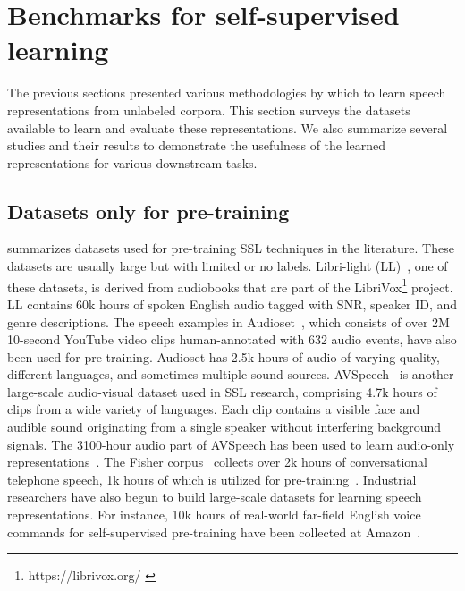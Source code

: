 
\section{Benchmarks for self-supervised learning}
\label{section:benchmark}

The previous sections presented various methodologies by which to learn speech
representations from unlabeled corpora. This section surveys the datasets
available to learn and evaluate these representations. We also summarize
several studies and their results to demonstrate the usefulness of the learned
representations for various downstream tasks. 

\subsection{Datasets only for pre-training} 
 summarizes datasets used for pre-training SSL techniques
in the literature. These datasets are usually large but with limited or no
labels. Libri-light (LL)~\parencite{kahn_libri-light_2020}, one of these datasets, is
derived from audiobooks that are part of the
LibriVox\footnote{https://librivox.org/ \label{librivox}} project. LL contains
60k hours of spoken English audio tagged with SNR, speaker ID, and genre
descriptions. The speech examples in Audioset~\parencite{gemmeke_audio_2017}, which
consists of over 2M 10-second YouTube video clips human-annotated with 632
audio events, have also been used for pre-training. Audioset has 2.5k hours
of audio of varying quality, different languages, and sometimes multiple sound
sources. AVSpeech~\parencite{ephrat_looking_2018} is another large-scale audio-visual
dataset used in SSL research, comprising 4.7k hours of clips from a wide
variety of languages. 
Each clip contains a visible face and audible sound originating from a single
speaker without interfering background signals. The 3100-hour audio part of
AVSpeech has been used to learn audio-only 
representations~\parencite{kawakami_learning_2020}. The Fisher corpus~\parencite{cieri_fisher_2004} collects
over 2k hours of conversational telephone speech, 1k hours of which is utilized
for pre-training~\parencite{jiang_further_2021}. Industrial researchers have also
begun to build large-scale datasets for learning speech representations.
For instance, 10k hours of real-world far-field English voice commands for
self-supervised pre-training have been collected at 
Amazon~\parencite{sadhu_wav2vecc_2021}. 

